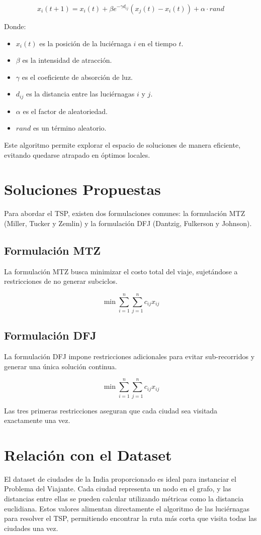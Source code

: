 \documentclass{article}
\begin{document}
\[
x_i(t+1) = x_i(t) + \beta e^{-\gamma d_{ij}} (x_j(t) - x_i(t)) + \alpha \cdot rand
\]

Donde:
\begin{itemize}
    \item \( x_i(t) \) es la posición de la luciérnaga \( i \) en el tiempo \( t \).
    \item \( \beta \) es la intensidad de atracción.
    \item \( \gamma \) es el coeficiente de absorción de luz.
    \item \( d_{ij} \) es la distancia entre las luciérnagas \( i \) y \( j \).
    \item \( \alpha \) es el factor de aleatoriedad.
    \item \( rand \) es un término aleatorio.
\end{itemize}

Este algoritmo permite explorar el espacio de soluciones de manera eficiente, evitando quedarse atrapado en óptimos locales.

\section{Soluciones Propuestas}
Para abordar el TSP, existen dos formulaciones comunes: la formulación MTZ (Miller, Tucker y Zemlin) y la formulación DFJ (Dantzig, Fulkerson y Johnson).

\subsection{Formulación MTZ}
La formulación MTZ busca minimizar el costo total del viaje, sujetándose a restricciones de no generar subciclos.

\[
\min \sum_{i=1}^{n} \sum_{j=1}^{n} c_{ij} x_{ij}
\]

\subsection{Formulación DFJ}
La formulación DFJ impone restricciones adicionales para evitar sub-recorridos y generar una única solución continua.

\[
\min \sum_{i=1}^{n} \sum_{j=1}^{n} c_{ij} x_{ij}
\]

Las tres primeras restricciones aseguran que cada ciudad sea visitada exactamente una vez.

\section{Relación con el Dataset}
El dataset de ciudades de la India proporcionado es ideal para instanciar el Problema del Viajante. Cada ciudad representa un nodo en el grafo, y las distancias entre ellas se pueden calcular utilizando métricas como la distancia euclidiana. Estos valores alimentan directamente el algoritmo de las luciérnagas para resolver el TSP, permitiendo encontrar la ruta más corta que visita todas las ciudades una vez.
\end{document}
